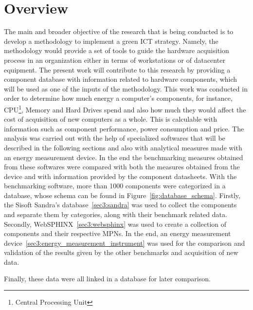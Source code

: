 \section{Overview} \label{sec3:overview}
    The main and broader objective of the research that is being conducted is to develop a methodology to implement a green ICT strategy. Namely, the methodology would provide a set of tools to guide the hardware acquisition process in an organization either in terms of workstations or of datacenter equipment. The present work will contribute to this research by providing a component database with information related to hardware components, which will be used as one of the inputs of the methodology. This work was conducted in order to determine how much energy a computer's components, for instance, CPU\footnote{Central Processing Unit}, Memory and Hard Drives spend and also how much they would affect the cost of acquisition of new computers as a whole. This is calculable with information such as component performance, power consumption and price. The analysis was carried out with the help of specialized softwares that will be described in the following sections and also with analytical measures made with an energy measurement device. In the end the benchmarking measures obtained from these softwares were compared with both the measures obtained from the device and with information provided by the component datasheets. With the benchmarking software, more than 1000 components were categorized in a database, whose schema can be found in Figure~\ref{fig:database_schema}. Firstly, the Sisoft Sandra's database~\ref{sec3:sandra} was used to collect the components and separate them by categories, along with their benchmark related data. Secondly, WebSPHINX~\ref{sec3:websphinx} was used to create a collection of components and their respective MPNs. In the end, an energy measurement device~\ref{sec3:energy_measurement_instrument} was used for the comparison and validation of the results given by the other benchmarks and acquisition of new data. 

    Finally, these data were all linked in a database for later comparison. 

